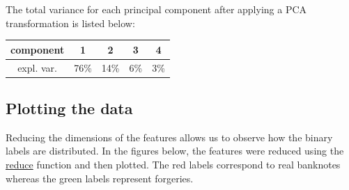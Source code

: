 \documentclass[14pt]{article}
\theoremstyle{plain}
\theoremstyle{definition}
\begin{document}
\noindent The total variance for each principal component after applying a PCA transformation is listed below:\\
\begin{center}
\begin{tabular}{|c|c|c|c|c|}
	\hline
	component & 1 & 2 & 3& 4\\
	\hline
	expl. var.& 76\%&  14\% & 6\% & 3\%\\
	 \hline
\end{tabular}
\end{center}
    
   
    
\subsection{Plotting the data}\label{SVM1} Reducing the dimensions of the features allows us to observe how the binary labels are distributed. In the figures below, the features were reduced using the \underline{reduce} function and then plotted. The red labels correspond to real banknotes whereas the green labels represent forgeries.
\end{document}
